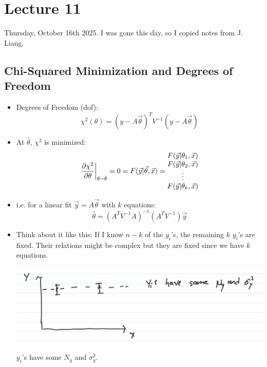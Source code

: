 \section{Lecture 11}

Thursday, October 16th 2025. I was gone this day, so I copied notes from J. Liang.

\subsection{Chi-Squared Minimization and Degrees of Freedom}

\begin{itemize}
    \item Degrees of Freedom (dof):
          \[
              \chi^2(\theta) = (y - A \vec{\theta})^T V^{-1} (y - A \vec{\theta})
          \]
    \item At $\hat{\theta}$, $\chi^2$ is minimized:
          \[
              \pdv{\chi^2}{\theta}\bigg|_{\theta = \hat{\theta}} = 0 =
              F(\vec{y} | \vec{\theta}, \vec{x}) =
              \begin{matrix}
                  F(\vec{y} | \theta_1, \vec{x}) \\
                  F(\vec{y} | \theta_2, \vec{x}) \\
                  \vdots                         \\
                  F(\vec{y} | \theta_k, \vec{x})
              \end{matrix}
          \]
    \item i.e. for a linear fit $\vec{y} = A \vec{\theta}$ with $k$ equations:
          \[
              \hat{\theta} = (A^T V^{-1} A)^{-1} (A^T V^{-1}) \vec{y}
          \]
    \item Think about it like this: If I know $n-k$ of the $y_i$'s, the remaining $k$ $y_i$'s are fixed. Their relations might be complex but they are fixed since we have $k$ equations.

          \includegraphics[width=0.8\linewidth]{Images/lec11-chisqu-example.png}

          $y_i$'s have some $N_y$ and $\sigma_y^2$.
\end{itemize}

